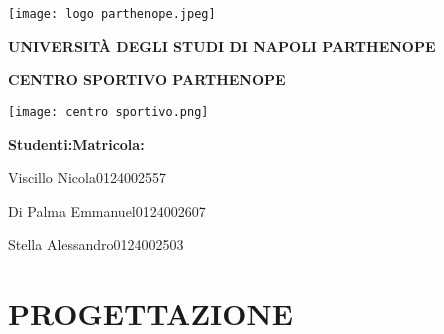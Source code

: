 \documentclass{article}
\begin{document}
\begin{center}
    \texttt{[image: logo parthenope.jpeg]}
\end{center}

\begin{center}
    \LARGE{\textbf{UNIVERSITÀ DEGLI STUDI DI NAPOLI PARTHENOPE}}
    \vspace{3mm}
\end{center}

\vspace{5mm}

\begin{center}
    \LARGE{\textbf{CENTRO SPORTIVO PARTHENOPE}}
\end{center}
\vspace{5mm}
\begin{center}
    \texttt{[image: centro sportivo.png]}
\end{center}

\vspace{5mm}

\begin{flushleft}
    {\textbf{Studenti:\hspace{3,5cm}Matricola:}}
    \vspace{5mm}

    Viscillo Nicola\hspace{3cm}0124002557
    
    Di Palma Emmanuel\hspace{2cm}0124002607
    
    Stella Alessandro\hspace{2,55cm}0124002503
\end{flushleft}

\newpage
\tableofcontents
\newpage
\section{PROGETTAZIONE}
\end{document}
